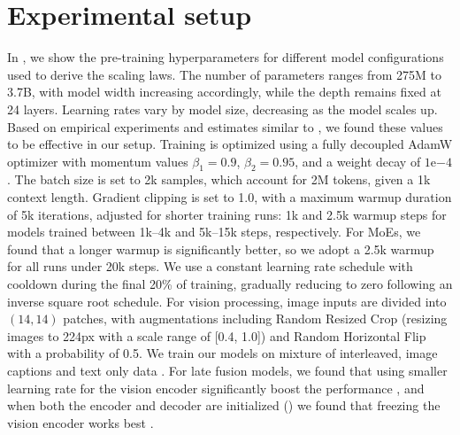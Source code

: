 






\section{Experimental setup}
\label{app:implementation_details}

In , we show the pre-training hyperparameters for different model configurations used to derive the scaling laws. The number of parameters ranges from 275M to 3.7B, with model width increasing accordingly, while the depth remains fixed at 24 layers. Learning rates vary by model size, decreasing as the model scales up. Based on empirical experiments and estimates similar to \citep{mckinzie2025mm1}, we found these values to be effective in our setup. Training is optimized using a fully decoupled AdamW optimizer with momentum values $\beta_1=0.9$, $\beta_2=0.95$, and a weight decay of $1\text{e}{-4}$. The batch size is set to 2k samples, which account for 2M tokens, given a 1k context length.  Gradient clipping is set to 1.0, with a maximum warmup duration of 5k iterations, adjusted for shorter training runs: 1k and 2.5k warmup steps for models trained between 1k–4k and 5k–15k steps, respectively. For MoEs, we found that a longer warmup is significantly better, so we adopt a 2.5k warmup for all runs under 20k steps. We use a constant learning rate schedule with cooldown during the final 20\% of training, gradually reducing to zero following an inverse square root schedule. For vision processing, image inputs are divided into $(14,14)$ patches, with augmentations including Random Resized Crop (resizing images to 224px with a scale range of [0.4, 1.0]) and Random Horizontal Flip with a probability of 0.5.  We train our models on mixture of interleaved, image captions and text only data .
For late fusion models, we found that using smaller learning rate for the vision encoder significantly boost the performance , and when both the encoder and decoder are initialized () we found that freezing the vision encoder works best .


 

          




